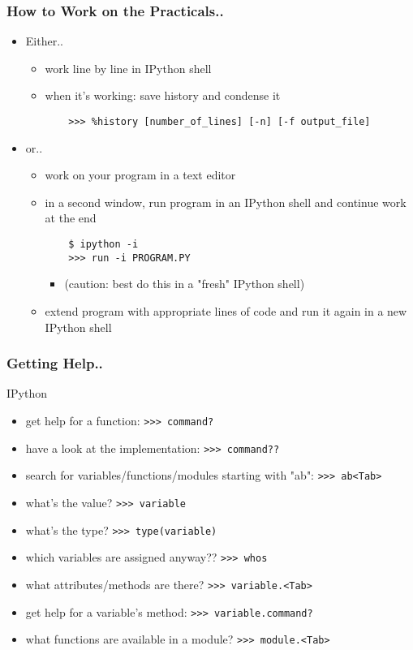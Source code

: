 \documentclass[t,10pt,compress=false,usepdftitle=false]{beamer}
\begin{document}
\begin{frame}[fragile]
    \frametitle{How to Work on the Practicals..}
    \begin{itemize}
    \item Either..
        \begin{itemize}
        \item work line by line in IPython shell
        \item when it's working: save history and condense it
    \begin{verbatim}
    >>> %history [number_of_lines] [-n] [-f output_file]
    \end{verbatim}
        \end{itemize}
    \item or..
        \begin{itemize}
        \item work on your program in a text editor
        \item in a second window, run program in an IPython shell and continue work at the end
    \begin{verbatim}
    $ ipython -i
    >>> run -i PROGRAM.PY
    \end{verbatim}
            \begin{itemize}
            \item (caution: best do this in a "fresh" IPython shell)
            \end{itemize}
        \item extend program with appropriate lines of code and run it again in a new IPython shell
        \end{itemize}
    \end{itemize}
\end{frame}

\begin{frame}[fragile]
    \frametitle{Getting Help..}
    IPython
    \begin{itemize}
    \item get help for a function: \verb#>>> command?#
    \item have a look at the implementation: \verb#>>> command??#
    \item search for variables/functions/modules starting with "ab": \verb#>>> ab<Tab>#
    \item what's the value? \verb#>>> variable#
    \item what's the type? \verb#>>> type(variable)#
    \item which variables are assigned anyway?? \verb#>>> whos#
    \item what attributes/methods are there? \verb#>>> variable.<Tab>#
    \item get help for a variable's method: \verb#>>> variable.command?#
    \item what functions are available in a module? \verb#>>> module.<Tab>#
    \end{itemize}
\end{frame}
\end{document}
